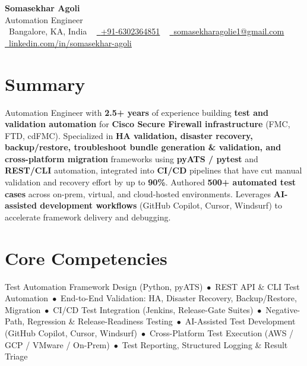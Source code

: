 \documentclass[letterpaper,11pt]{article}
\begin{document}




\begin{center}
    {\Huge \bfseries \color{name} Somasekhar Agoli} \\[3pt]
    {\large \color{tagline} Automation Engineer} \\[5pt]
    \small
    \raisebox{-0.1\height}\faMapMarker\ Bangalore, KA, India ~
    \href{tel:+916302364851}{\raisebox{-0.1\height}\faPhone\ \underline{+91-6302364851}} ~
    \href{mailto:somasekharagolie1@gmail.com}{\raisebox{-0.2\height}\faEnvelope\ \underline{somasekharagolie1@gmail.com}} ~
    \href{https://www.linkedin.com/in/somasekhar-agoli/}{\raisebox{-0.2\height}\faLinkedinSquare\ \underline{linkedin.com/in/somasekhar-agoli}}
\end{center}


\section{Summary}
Automation Engineer with \textbf{2.5+ years} of experience building \textbf{test and validation automation} for \textbf{Cisco Secure Firewall infrastructure} (FMC, FTD, cdFMC). Specialized in \textbf{HA validation, disaster recovery, backup/restore, troubleshoot bundle generation \& validation, and cross-platform migration} frameworks using \textbf{pyATS / pytest} and \textbf{REST/CLI} automation, integrated into \textbf{CI/CD} pipelines that have cut manual validation and recovery effort by up to \textbf{90\%}. Authored \textbf{500+ automated test cases} across on-prem, virtual, and cloud-hosted environments. Leverages \textbf{AI-assisted development workflows} (GitHub Copilot, Cursor, Windsurf) to accelerate framework delivery and debugging.

\section{Core Competencies}
\small
Test Automation Framework Design (Python, pyATS)~$\bullet$~REST API \& CLI Test Automation~$\bullet$~End-to-End Validation: HA, Disaster Recovery, Backup/Restore, Migration~$\bullet$~CI/CD Test Integration (Jenkins, Release-Gate Suites)~$\bullet$~Negative-Path, Regression \& Release-Readiness Testing~$\bullet$~AI-Assisted Test Development (GitHub Copilot, Cursor, Windsurf)~$\bullet$~Cross-Platform Test Execution (AWS / GCP / VMware / On-Prem)~$\bullet$~Test Reporting, Structured Logging \& Result Triage
\vspace{4pt}
\end{document}
